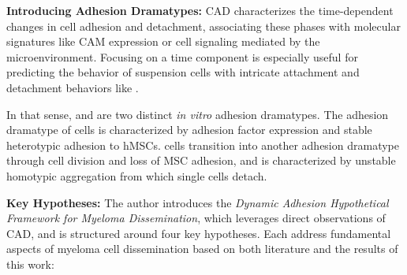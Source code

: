 \textbf{Introducing Adhesion Dramatypes:}
\acf{CAD} characterizes the time-dependent changes in cell
adhesion and detachment, associating these phases with molecular signatures like
\ac{CAM} expression or cell signaling mediated by the microenvironment. Focusing
on a time component is especially useful for predicting the behavior of
suspension cells with intricate attachment and detachment behaviors like \INA.

In that sense, \MAina and \nMAina are two distinct \textit{in vitro} adhesion
dramatypes. The adhesion dramatype of \MAina cells is characterized by adhesion
factor expression and stable heterotypic adhesion to \acp{hMSC}. \MAina cells
transition into another adhesion dramatype \dashed{\nMAina} through cell
division and loss of MSC adhesion, and is characterized by unstable homotypic
aggregation from which single cells detach.


\textbf{Key Hypotheses:}
The author introduces the \emph{Dynamic Adhesion Hypothetical Framework for
      Myeloma Dissemination}, which leverages direct observations of
\ac{CAD}, and is structured around four key hypotheses. Each
address fundamental aspects of myeloma cell dissemination based on both
literature and the results of this work:



\newcommand{\caddramatype}{ %
      \textbf{Myeloma cells change their adhesion dramatype during dissemination.}
      In response to different environmental cues faced during dissemination,
      myeloma cells switch, change or adapt their \ac{CAD}. These states are
      characterized by adhesion dramatpyes\footref{foot:adhesiondt}. Different
      steps in dissemination involve distinct adhesion dramatypes, or instance,
      one for specialized colonizing new sites and one specialized for vascular
      interactions. %
}%
\newcommand{\caddramatypetitle}{ %
      \textit{Hypothesis 1}: Cells Change their Adhesion Dramatype during Dissemination%
}%


\newcommand{\cadplasticity}{ %
      \textbf{Rapid \ac{CAD} plasticity is a hallmark of aggressive myeloma.}
      Dramatypic plasticity describes the overall repertoire of available
      adhesional behaviors within each individual myeloma cell. However, such
      plasticity is limited by the rapidness of deploying a specialized adhesion
      dramatypes during steps of dissemination.
}%
\newcommand{\cadplasticitytitle}{ %
      \textit{Hypothesis 2}: Rapid CAD Plasticity is a Hallmark of
      Aggressive Myeloma %
}%


